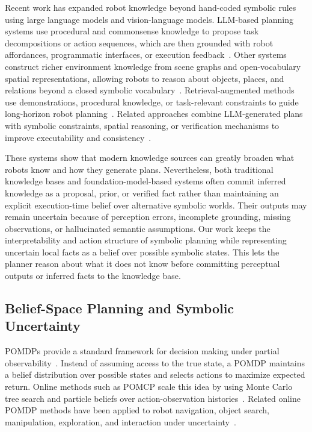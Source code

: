 Recent work has expanded robot knowledge beyond hand-coded symbolic rules using large language models and vision-language models. LLM-based planning systems use procedural and commonsense knowledge to propose task decompositions or action sequences, which are then grounded with robot affordances, programmatic interfaces, or execution feedback~\cite{ahn2022can,huang2022inner,singh2023progprompt,liang2023code,ding2023task}. Other systems construct richer environment knowledge from scene graphs and open-vocabulary spatial representations, allowing robots to reason about objects, places, and relations beyond a closed symbolic vocabulary~\cite{gu2024conceptgraphs,leanza2025conceptbot}. Retrieval-augmented methods use demonstrations, procedural knowledge, or task-relevant constraints to guide long-horizon robot planning~\cite{singh2025adaptbot,zhouenhancing,xu2024p,wang2025instructrag,kumar2026open}. Related approaches combine LLM-generated plans with symbolic constraints, spatial reasoning, or verification mechanisms to improve executability and consistency~\cite{huang2023voxposer,dai2024optimal,liu2025delta,paulius2025bootstrapping,quartey2025verifiably}.

These systems show that modern knowledge sources can greatly broaden what robots know and how they generate plans. Nevertheless, both traditional knowledge bases and foundation-model-based systems often commit inferred knowledge as a proposal, prior, or verified fact rather than maintaining an explicit execution-time belief over alternative symbolic worlds. Their outputs may remain uncertain because of perception errors, incomplete grounding, missing observations, or hallucinated semantic assumptions. Our work keeps the interpretability and action structure of symbolic planning while representing uncertain local facts as a belief over possible symbolic states. This lets the planner reason about what it does not know before committing perceptual outputs or inferred facts to the knowledge base.

\subsection{Belief-Space Planning and Symbolic Uncertainty}
\label{sec:related_uncertainty}

POMDPs provide a standard framework for decision making under partial observability~\cite{kaelbling1998planning}. Instead of assuming access to the true state, a POMDP maintains a belief distribution over possible states and selects actions to maximize expected return. Online methods such as POMCP scale this idea by using Monte Carlo tree search and particle beliefs over action-observation histories~\cite{silver2010monte}. Related online POMDP methods have been applied to robot navigation, object search, manipulation, exploration, and interaction under uncertainty~\cite{somani2013despot,lauri2016exploration,xiao2019objectsearch,pajarinen2022composition}.

